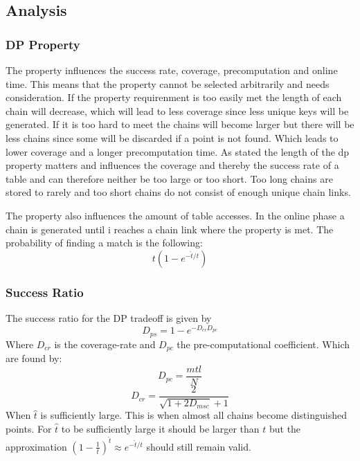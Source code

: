 \subsection{Analysis}
\subsubsection{DP Property}
The property influences the success rate, coverage, precomputation and online time. This means that the property cannot be selected arbitrarily and needs consideration. If the property requirenment is too easily met the length of each chain will decrease, which will lead to less coverage since less unique keys will be generated. If it is too hard to meet the chains will become larger but there will be less chains since some will be discarded if a point is not found. Which leads to lower coverage and a longer precomputation time. As stated the length of the dp property matters and influences the coverage and thereby the success rate of a table and can therefore neither be too large or too short. Too long chains are stored to rarely and too short chains do not consist of enough unique chain links.

The property also influences the amount of table accesses. In the online phase a chain is generated until i reaches a chain link where the property is met. The probability of finding a match is the following:
\begin{equation}
t(1-e^{-\hat{t}/t})
\end{equation}

\subsubsection{Success Ratio}
The success ratio for the DP tradeoff is given by
\begin{equation}
  D_{ps}=1-e^{-D_{cr}D_{pc}}
\end{equation}
Where $D_{cr}$ is the coverage-rate and $D_{pc}$ the pre-computational coefficient. Which are found by:
\begin{equation}
  D_{pc}=\frac{mtl}{N}
\end{equation}
\begin{equation}
  D_{cr}=\frac{2}{\sqrt{1+2D_{msc}}+1}
\end{equation}
When $\hat{t}$ is sufficiently large. This is when almost all chains become distinguished points. For $\hat{t}$ to be sufficiently large it should be larger than $t$ but the approximation $(1-\frac{1}{t})^{\hat{t}}\approx e^{-\hat{t}/t}$ should still remain valid.

